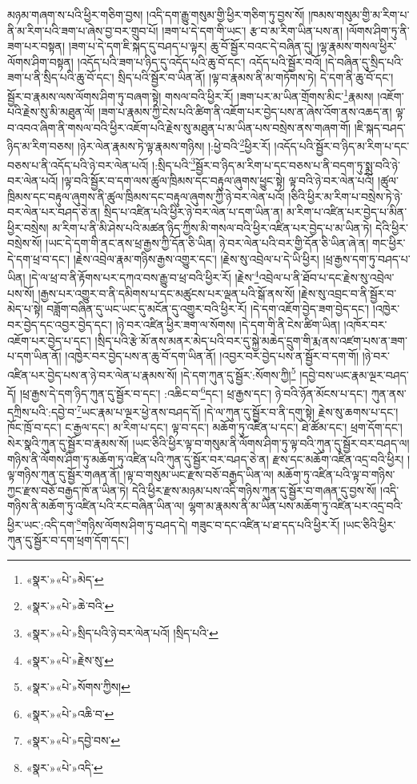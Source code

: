 མཉམ་གཞག་ས་པའི་ཕྱིར་གཅིག་བྱས། །འདི་དག་རྒྱུ་གསུམ་གྱི་ཕྱིར་གཅིག་ཏུ་བྱས་སོ། །ཁམས་གསུམ་གྱི་མ་རིག་པ་ནི་མ་རིག་པའི་ཟག་པ་ཞེས་བྱ་བར་གྲུབ་པོ། །ཟག་པ་དེ་དག་གི་ཡང་། རྩ་བ་མ་རིག་ཡིན་པས་ན། །ལོགས་ཤིག་ཏུ་ནི་ཟག་པར་བསྟན། །ཟག་པ་དེ་དག་ཇི་སྐད་དུ་བཤད་པ་ལྟར། ཆུ་བོ་སྦྱོར་བའང་དེ་བཞིན་དུ། །ལྷ་རྣམས་གསལ་ཕྱིར་ལོགས་ཤིག་བསྟན། །འདོད་པའི་ཟག་པ་ཉིད་དུ་འདོད་པའི་ཆུ་བོ་དང་། འདོད་པའི་སྦྱོར་བའོ། །དེ་བཞིན་དུ་སྲིད་པའི་ཟག་པ་ནི་སྲིད་པའི་ཆུ་བོ་དང་། སྲིད་པའི་སྦྱོར་བ་ཡིན་ནོ། །ལྟ་བ་རྣམས་ནི་མ་གཏོགས་ཏེ། དེ་དག་ནི་ཆུ་བོ་དང་། སྦྱོར་བ་རྣམས་ལས་ལོགས་ཤིག་ཏུ་བཞག་སྟེ། གསལ་བའི་ཕྱིར་རོ། །ཟག་པར་མ་ཡིན་གྲོགས་མིང་\footnote{«སྣར་»«པེ་»མེད་}རྣམས། །འཇོག་པའི་རྗེས་སུ་མི་མཐུན་ལོ། །ཟག་པ་རྣམས་ཀྱི་ངེས་པའི་ཚིག་ནི་འཇོག་པར་བྱེད་པས་ན་ཞེས་འོག་ནས་འཆད་ན། ལྟ་བ་འབའ་ཞིག་ནི་གསལ་བའི་ཕྱིར་འཇོག་པའི་རྗེས་སུ་མཐུན་པ་མ་ཡིན་པས་བསྲེས་ནས་གཞག་གོ། །ཇི་སྐད་བཤད་ཉིད་མ་རིག་བཅས། །ཉེར་ལེན་རྣམས་ཏེ་ལྟ་རྣམས་གཉིས། །:ཕྱེ་བའི་\footnote{«སྣར་»«པེ་»ཆེ་བའི་}ཕྱིར་རོ། །འདོད་པའི་སྦྱོར་བ་ཉིད་མ་རིག་པ་དང་བཅས་པ་ནི་འདོད་པའི་ཉེ་བར་ལེན་པའོ། །:སྲིད་པའི་\footnote{«སྣར་»«པེ་»སྲིད་པའི་ཉེ་བར་ལེན་པའོ། །སྲིད་པའི་}སྦྱོར་བ་ཉིད་མ་རིག་པ་དང་བཅས་པ་ནི་བདག་ཏུ་སྨྲ་བའི་ཉེ་བར་ལེན་པའོ། །ལྟ་བའི་སྦྱོར་བ་དག་ལས་ཚུལ་ཁྲིམས་དང་བརྟུལ་ཞུགས་ཕྱུང་སྟེ། ལྟ་བའི་ཉེ་བར་ལེན་པའོ། །ཚུལ་ཁྲིམས་དང་བརྟུལ་ཞུགས་ནི་ཚུལ་ཁྲིམས་དང་བརྟུལ་ཞུགས་ཀྱི་ཉེ་བར་ལེན་པའོ། །ཅིའི་ཕྱིར་མ་རིག་པ་བསྲེས་ཏེ་ཉེ་བར་ལེན་པར་བཤད་ཅེ་ན། སྲིད་པ་འཛིན་པའི་ཕྱིར་ཉེ་བར་ལེན་པ་དག་ཡིན་ན། མ་རིག་པ་འཛིན་པར་བྱེད་པ་མིན་ཕྱིར་བསྲེས། མ་རིག་པ་ནི་མི་ཤེས་པའི་མཚན་ཉིད་ཀྱིས་མི་གསལ་བའི་ཕྱིར་འཛིན་པར་བྱེད་པ་མ་ཡིན་ཏེ། དེའི་ཕྱིར་བསྲེས་སོ། །ཡང་དེ་དག་གི་ནང་ནས་ཕྲ་རྒྱས་ཀྱི་དོན་ཅི་ཡིན། ཉེ་བར་ལེན་པའི་བར་གྱི་དོན་ཅི་ཡིན་ཞེ་ན། གང་ཕྱིར་དེ་དག་ཕྲ་བ་དང་། །རྗེས་འབྲེལ་རྣམ་གཉིས་རྒྱས་འགྱུར་དང་། །རྗེས་སུ་འབྲེལ་པ་དེ་ཡི་ཕྱིར། །ཕྲ་རྒྱས་དག་ཏུ་བཤད་པ་ཡིན། །དེ་ལ་ཕྲ་བ་ནི་རྟོགས་པར་དཀའ་བས་རྒྱུ་བ་ཕྲ་བའི་ཕྱིར་རོ། །རྗེས་\footnote{«སྣར་»«པེ་»རྗེས་སུ་}འབྲེལ་པ་ནི་ཐོབ་པ་དང་རྗེས་སུ་འབྲེལ་པས་སོ། །རྒྱས་པར་འགྱུར་བ་ནི་དམིགས་པ་དང་མཚུངས་པར་ལྡན་པའི་སྒོ་ནས་སོ། །རྗེས་སུ་འབྲང་བ་ནི་སྦྱོར་བ་མེད་པ་སྟེ། བཟློག་བཞིན་དུ་ཡང་ཡང་དུ་མངོན་དུ་འགྱུར་བའི་ཕྱིར་རོ། །དེ་དག་འཇོག་བྱེད་ཟག་བྱེད་དང་། །འཁྱེར་བར་བྱེད་དང་འབྱར་བྱེད་དང་། །ཉེ་བར་འཛིན་ཕྱིར་ཟག་ལ་སོགས། །དེ་དག་གི་ནི་ངེས་ཚིག་ཡིན། །འཁོར་བར་འཇོག་པར་བྱེད་པ་དང་། །སྲིད་པའི་རྩེ་མོ་ནས་མནར་མེད་པའི་བར་དུ་སྐྱེ་མཆེད་དྲུག་གི་རྨ་ནས་འཛག་པས་ན་ཟག་པ་དག་ཡིན་ནོ། །འཁྱེར་བར་བྱེད་པས་ན་ཆུ་བོ་དག་ཡིན་ནོ། །འབྱར་བར་བྱེད་པས་ན་སྦྱོར་བ་དག་གོ། །ཉེ་བར་འཛིན་པར་བྱེད་པས་ན་ཉེ་བར་ལེན་པ་རྣམས་སོ། །དེ་དག་ཀུན་དུ་སྦྱོར་:སོགས་ཀྱི།\footnote{«སྣར་»«པེ་»སོགས་ཀྱིས།} །དབྱེ་བས་ཡང་རྣམ་ལྔར་བཤད་དོ། །ཕྲ་རྒྱས་དེ་དག་ཉིད་ཀུན་དུ་སྦྱོར་བ་དང་། :འཆིང་བ་\footnote{«སྣར་»«པེ་»འཆི་བ་}དང་། ཕྲ་རྒྱས་དང་། ཉེ་བའི་ཉོན་མོངས་པ་དང་། ཀུན་ནས་དཀྲིས་པའི་:དབྱེ་བ་\footnote{«སྣར་»«པེ་»དབྱེ་བས་}ཡང་རྣམ་པ་ལྔར་ཕྱེ་ནས་བཤད་དོ། །དེ་ལ་ཀུན་དུ་སྦྱོར་བ་ནི་དགུ་སྟེ། རྗེས་སུ་ཆགས་པ་དང་། ཁོང་ཁྲོ་བ་དང་། ང་རྒྱལ་དང་། མ་རིག་པ་དང་། ལྟ་བ་དང་། མཆོག་ཏུ་འཛིན་པ་དང་། ཐེ་ཚོམ་དང་། ཕྲག་དོག་དང་། སེར་སྣའི་ཀུན་དུ་སྦྱོར་བ་རྣམས་སོ། །ཡང་ཅིའི་ཕྱིར་ལྟ་བ་གསུམ་ནི་ལོགས་ཤིག་ཏུ་ལྟ་བའི་ཀུན་དུ་སྦྱོར་བར་བཤད་ལ། གཉིས་ནི་ལོགས་ཤིག་ཏུ་མཆོག་ཏུ་འཛིན་པའི་ཀུན་དུ་སྦྱོར་བར་བཤད་ཅེ་ན། རྫས་དང་མཆོག་འཛིན་འདྲ་བའི་ཕྱིར། །ལྟ་གཉིས་ཀུན་དུ་སྦྱོར་གཞན་ནོ། །ལྟ་བ་གསུམ་ཡང་རྫས་བཅོ་བརྒྱད་ཡིན་ལ། མཆོག་ཏུ་འཛིན་པའི་ལྟ་བ་གཉིས་ཀྱང་རྫས་བཅོ་བརྒྱད་ཁོ་ན་ཡིན་ཏེ། དེའི་ཕྱིར་རྫས་མཉམ་པས་འདི་གཉིས་ཀུན་དུ་སྦྱོར་བ་གཞན་དུ་བྱས་སོ། །འདི་གཉིས་ནི་མཆོག་ཏུ་འཛིན་པའི་རང་བཞིན་ཡིན་ལ། ལྷག་མ་རྣམས་ནི་མ་ཡིན་པས་མཆོག་ཏུ་འཛིན་པར་འདྲ་བའི་ཕྱིར་ཡང་:འདི་དག་\footnote{«སྣར་»«པེ་»འདི་}གཉིས་ལོགས་ཤིག་ཏུ་བཤད་དེ། གཟུང་བ་དང་འཛིན་པ་ཐ་དད་པའི་ཕྱིར་རོ། །ཡང་ཅིའི་ཕྱིར་ཀུན་དུ་སྦྱོར་བ་དག་ཕྲག་དོག་དང་། 